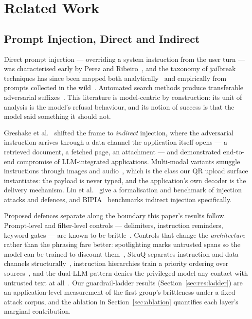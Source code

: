 \section{Related Work}
\label{sec:related}

\subsection{Prompt Injection, Direct and Indirect}
\label{sec:rel:injection}

Direct prompt injection --- overriding a system instruction from the
user turn --- was characterised early by Perez and
Ribeiro~\cite{perez2022ignore}, and the taxonomy of jailbreak techniques
has since been mapped both analytically~\cite{wei2023jailbroken} and
empirically from prompts collected in the wild~\cite{shen2024dan}.
Automated search methods produce transferable adversarial
suffixes~\cite{zou2023universal}. This literature is model-centric by
construction: its unit of analysis is the model's refusal behaviour, and
its notion of success is that the model said something it should not.

Greshake et al.~\cite{greshake2023} shifted the frame to
\emph{indirect} injection, where the adversarial instruction arrives
through a data channel the application itself opens --- a retrieved
document, a fetched page, an attachment --- and demonstrated end-to-end
compromise of LLM-integrated applications. Multi-modal variants smuggle
instructions through images and audio~\cite{bagdasaryan2023abusing},
which is the class our QR upload surface instantiates: the payload is
never typed, and the application's own decoder is the delivery mechanism.
Liu et al.~\cite{liu2024formalizing} give a formalisation and benchmark
of injection attacks and defences, and BIPIA~\cite{yi2023bipia}
benchmarks indirect injection specifically.

Proposed defences separate along the boundary this paper's results
follow. Prompt-level and filter-level controls --- delimiters,
instruction reminders, keyword gates --- are known to be
brittle~\cite{liu2024formalizing}. Controls that change the
\emph{architecture} rather than the phrasing fare better: spotlighting
marks untrusted spans so the model can be trained to discount
them~\cite{hines2024spotlighting}, StruQ separates instruction and data
channels structurally~\cite{chen2024struq}, instruction
hierarchies train a priority ordering over
sources~\cite{wallace2024hierarchy}, and the dual-LLM pattern denies the
privileged model any contact with untrusted text at
all~\cite{willison2023dual}. Our guardrail-ladder results
(Section~\ref{sec:res:ladder}) are an application-level measurement of
the first group's brittleness under a fixed attack corpus, and the
ablation in Section~\ref{sec:ablation} quantifies each layer's marginal
contribution.

